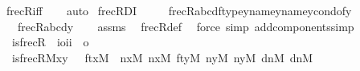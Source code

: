 \begin{isabellebody}
\ frecR{\isacharunderscore}{\kern0pt}iff\isanewline
\ \ \isamarkupfalse%
\ auto%
\endisatagproof
{\isafoldproof}%
%
\isadelimproof
\isanewline
%
\endisadelimproof
\isanewline
{}\isamarkupfalse%
\ frecR{\isacharunderscore}{\kern0pt}DI\ {\isacharcolon}{\kern0pt}\ \isanewline
\ \ \ {\isachardoublequoteopen}frecR{\isacharparenleft}{\kern0pt}{\isasymlangle}a{\isacharcomma}{\kern0pt}b{\isacharcomma}{\kern0pt}c{\isacharcomma}{\kern0pt}d{\isasymrangle}{\isacharcomma}{\kern0pt}{\isasymlangle}ftype{\isacharparenleft}{\kern0pt}y{\isacharparenright}{\kern0pt}{\isacharcomma}{\kern0pt}name{}{\isacharparenleft}{\kern0pt}y{\isacharparenright}{\kern0pt}{\isacharcomma}{\kern0pt}name{}{\isacharparenleft}{\kern0pt}y{\isacharparenright}{\kern0pt}{\isacharcomma}{\kern0pt}cond{\isacharunderscore}{\kern0pt}of{\isacharparenleft}{\kern0pt}y{\isacharparenright}{\kern0pt}{\isasymrangle}{\isacharparenright}{\kern0pt}{\isachardoublequoteclose}\isanewline
\ \ \ {\isachardoublequoteopen}frecR{\isacharparenleft}{\kern0pt}{\isasymlangle}a{\isacharcomma}{\kern0pt}b{\isacharcomma}{\kern0pt}c{\isacharcomma}{\kern0pt}d{\isasymrangle}{\isacharcomma}{\kern0pt}y{\isacharparenright}{\kern0pt}{\isachardoublequoteclose}\isanewline
%
\isadelimproof
\ \ %
\endisadelimproof
%
\isatagproof
{}\isamarkupfalse%
\ assms\ \isamarkupfalse%
\ frecR{\isacharunderscore}{\kern0pt}def\ \isamarkupfalse%
\ {\isacharparenleft}{\kern0pt}force\ simp\ add{\isacharcolon}{\kern0pt}components{\isacharunderscore}{\kern0pt}simp{\isacharparenright}{\kern0pt}%
\endisatagproof
{\isafoldproof}%
%
\isadelimproof
\isanewline
%
\endisadelimproof
\isanewline
\isanewline
{}\isamarkupfalse%
\isanewline
\ \ is{\isacharunderscore}{\kern0pt}frecR\ {\isacharcolon}{\kern0pt}{\isacharcolon}{\kern0pt}\ {\isachardoublequoteopen}{\isacharbrackleft}{\kern0pt}i{\isasymRightarrow}o{\isacharcomma}{\kern0pt}i{\isacharcomma}{\kern0pt}i{\isacharbrackright}{\kern0pt}\ {\isasymRightarrow}\ o{\isachardoublequoteclose}\ \isanewline
\ \ {\isachardoublequoteopen}is{\isacharunderscore}{\kern0pt}frecR{\isacharparenleft}{\kern0pt}M{\isacharcomma}{\kern0pt}x{\isacharcomma}{\kern0pt}y{\isacharparenright}{\kern0pt}\ {\isasymequiv}\ {\isasymexists}\ ftx{\isacharbrackleft}{\kern0pt}M{\isacharbrackright}{\kern0pt}{\isachardot}{\kern0pt}\ {\isasymexists}\ n{}x{\isacharbrackleft}{\kern0pt}M{\isacharbrackright}{\kern0pt}{\isachardot}{\kern0pt}\ {\isasymexists}n{}x{\isacharbrackleft}{\kern0pt}M{\isacharbrackright}{\kern0pt}{\isachardot}{\kern0pt}\ {\isasymexists}fty{\isacharbrackleft}{\kern0pt}M{\isacharbrackright}{\kern0pt}{\isachardot}{\kern0pt}\ {\isasymexists}n{}y{\isacharbrackleft}{\kern0pt}M{\isacharbrackright}{\kern0pt}{\isachardot}{\kern0pt}\ {\isasymexists}n{}y{\isacharbrackleft}{\kern0pt}M{\isacharbrackright}{\kern0pt}{\isachardot}{\kern0pt}\ {\isasymexists}dn{}{\isacharbrackleft}{\kern0pt}M{\isacharbrackright}{\kern0pt}{\isachardot}{\kern0pt}\ {\isasymexists}dn{}{\isacharbrackleft}{\kern0pt}M{\isacharbrackright}{\kern0pt}{\isachardot}{\kern0pt}\isanewline

\end{isabellebody}
